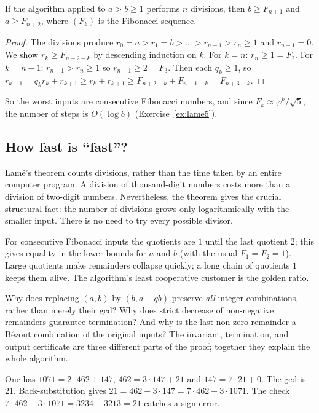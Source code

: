 \begin{theorem}[Lam\'e]\label{thm:lame}
If the algorithm applied to $a>b\ge1$ performs $n$ divisions, then $b\ge F_{n+1}$ and $a\ge F_{n+2}$, where $(F_k)$ is the Fibonacci sequence.
\end{theorem}
\begin{proof}
The divisions produce $r_0=a>r_1=b>\dots>r_{n-1}>r_n\ge1$ and $r_{n+1}=0$. We show $r_k\ge F_{n+2-k}$ by descending induction on $k$. For $k=n$: $r_n\ge1=F_2$. For $k=n-1$: $r_{n-1}>r_n\ge1$ so $r_{n-1}\ge2=F_3$. Then each $q_k\ge1$, so $r_{k-1}=q_kr_k+r_{k+1}\ge r_k+r_{k+1}\ge F_{n+2-k}+F_{n+1-k}=F_{n+3-k}$.
\end{proof}

So the worst inputs are consecutive Fibonacci numbers, and since $F_{k}\approx\varphi^k/\sqrt5$, the number of steps is $O(\log b)$ (Exercise~\ref{ex:lame5}).

\subsection*{How fast is ``fast''?}
Lam\'e's theorem counts divisions, rather than the time taken by an entire computer program. A division of thousand-digit numbers costs more than a division of two-digit numbers. Nevertheless, the theorem gives the crucial structural fact: the number of divisions grows only logarithmically with the smaller input. There is no need to try every possible divisor.

For consecutive Fibonacci inputs the quotients are $1$ until the last quotient $2$; this gives equality in the lower bounds for $a$ and $b$ (with the usual $F_1=F_2=1$). Large quotients make remainders collapse quickly; a long chain of quotients $1$ keeps them alive. The algorithm's least cooperative customer is the golden ratio.

\begin{reminder}
Why does replacing $(a,b)$ by $(b,a-qb)$ preserve \emph{all} integer combinations, rather than merely their gcd? Why does strict decrease of non-negative remainders guarantee termination? And why is the last non-zero remainder a B\'ezout combination of the original inputs? The invariant, termination, and output certificate are three different parts of the proof; together they explain the whole algorithm.
\end{reminder}

\begin{examplex}
One has $1071=2\cdot 462+147$, $462=3\cdot 147+21$ and $147=7\cdot 21+0$. The gcd is $21$. Back-substitution gives $21=462-3\cdot 147=7\cdot 462-3\cdot 1071$. The check $7\cdot 462-3\cdot 1071=3234-3213=21$ catches a sign error.
\end{examplex}

